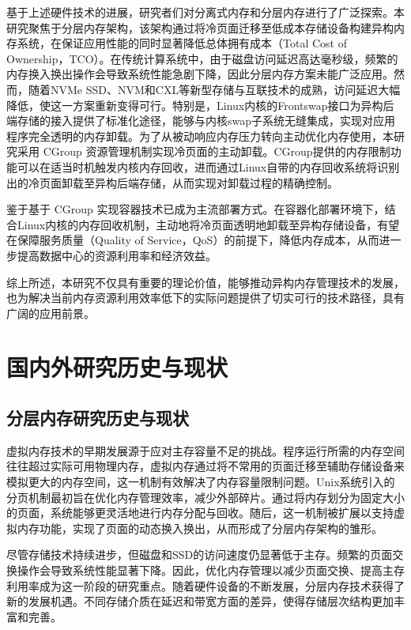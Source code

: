 基于上述硬件技术的进展，研究者们对分离式内存和分层内存进行了广泛探索。本研究聚焦于分层内存架构，该架构通过将冷页面迁移至低成本存储设备构建异构内存系统，在保证应用性能的同时显著降低总体拥有成本（Total Cost of Ownership，TCO）。在传统计算系统中，由于磁盘访问延迟高达毫秒级，频繁的内存换入换出操作会导致系统性能急剧下降，因此分层内存方案未能广泛应用。然而，随着NVMe SSD、NVM和CXL等新型存储与互联技术的成熟，访问延迟大幅降低，使这一方案重新变得可行。特别是，Linux内核的Frontswap接口为异构后端存储的接入提供了标准化途径，能够与内核swap子系统无缝集成，实现对应用程序完全透明的内存卸载。为了从被动响应内存压力转向主动优化内存使用，本研究采用 CGroup 资源管理机制实现冷页面的主动卸载。CGroup提供的内存限制功能可以在适当时机触发内核内存回收，进而通过Linux自带的内存回收系统将识别出的冷页面卸载至异构后端存储，从而实现对卸载过程的精确控制。

鉴于基于 CGroup 实现容器技术已成为主流部署方式。在容器化部署环境下，结合Linux内核的内存回收机制，主动地将冷页面透明地卸载至异构存储设备，有望在保障服务质量（Quality of Service，QoS）的前提下，降低内存成本，从而进一步提高数据中心的资源利用率和经济效益。

综上所述，本研究不仅具有重要的理论价值，能够推动异构内存管理技术的发展，也为解决当前内存资源利用效率低下的实际问题提供了切实可行的技术路径，具有广阔的应用前景。

\section{国内外研究历史与现状}

\subsection{分层内存研究历史与现状}

虚拟内存技术的早期发展源于应对主存容量不足的挑战。程序运行所需的内存空间往往超过实际可用物理内存，虚拟内存通过将不常用的页面迁移至辅助存储设备来模拟更大的内存空间，这一机制有效解决了内存容量限制问题。Unix系统引入的分页机制最初旨在优化内存管理效率，减少外部碎片。通过将内存划分为固定大小的页面，系统能够更灵活地进行内存分配与回收。随后，这一机制被扩展以支持虚拟内存功能，实现了页面的动态换入换出，从而形成了分层内存架构的雏形。

尽管存储技术持续进步，但磁盘和SSD的访问速度仍显著低于主存。频繁的页面交换操作会导致系统性能显著下降。因此，优化内存管理以减少页面交换、提高主存利用率成为这一阶段的研究重点。随着硬件设备的不断发展，分层内存技术获得了新的发展机遇。不同存储介质在延迟和带宽方面的差异，使得存储层次结构更加丰富和完善。

